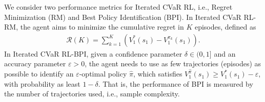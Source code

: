 \documentclass{article} %
\newcommand{\cR}{\mathcal{R}}
\newcommand{\sbr}[1]{\left( #1 \right)}
\begin{document}
	We consider two performance metrics for Iterated CVaR RL, i.e., Regret Minimization (RM) and Best Policy Identification (BPI). In Iterated CVaR RL-RM, the agent aims to minimize the cumulative regret in  $K$ episodes, defined as 
	\begin{align}
		\cR(K)=\sum_{k=1}^{K} \sbr{V^{*}_1(s_1)-V^{\pi_k}_1(s_1)} . \label{eq:regret}
	\end{align}
	In Iterated CVaR RL-BPI, given a confidence parameter $\delta \in (0,1]$ and an accuracy parameter $\varepsilon>0$, the agent needs to use as few trajectories (episodes) as possible to identify an $\varepsilon$-optimal policy $\hat{\pi}$, which satisfies
	$
	V^{\hat{\pi}}_1(s_1) \geq V^{*}_1(s_1) - \varepsilon 
	$, with probability as least $1-\delta$. 
	That is, the performance of BPI is measured by the number of trajectories used, i.e., sample complexity.
	
	
	
\end{document}
